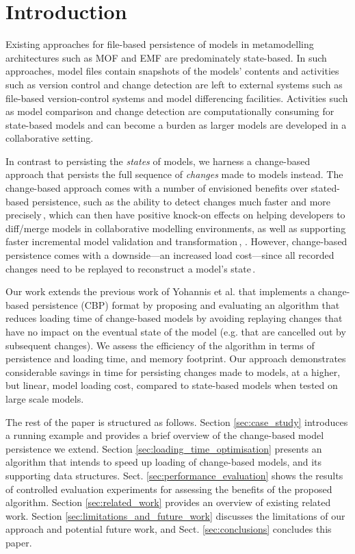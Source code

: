 \documentclass{llncs}
\begin{document}
\section{Introduction}
\label{sec:introduction}
Existing approaches for file-based persistence of models in metamodelling architectures such as MOF and EMF are predominately state-based. In such approaches, model files contain snapshots of the models' contents and activities such as version control and change detection are left to external systems such as file-based version-control systems and model differencing facilities. Activities such as model comparison and change detection are computationally consuming for state-based models and can become a burden as larger models are developed in a collaborative setting. 

In contrast to persisting the \emph{states} of models, we harness a change-based approach that persists the full sequence of \emph{changes} made to models instead. The change-based approach comes with a number of envisioned benefits over stated-based persistence, such as the ability to detect changes much faster and more precisely\,\cite{yohannis2017turning}, which can then have positive knock-on effects on helping developers to diff/merge models in collaborative modelling environments, as well as supporting faster incremental model validation and transformation\,\cite{rath2012derived}, \cite{ogunyomi2015property}. However, change-based persistence comes with a downside---an increased load cost---since all recorded changes need to be replayed to reconstruct a model's state\,\cite{yohannis2017turning}.   

Our work extends the previous work of Yohannis et al. \cite{yohannis2017turning} that implements a change-based persistence (CBP) format by proposing and evaluating an algorithm that reduces loading time of change-based models by avoiding replaying changes that have no impact on the eventual state of the model (e.g. that are cancelled out by subsequent changes). We assess the efficiency of the algorithm in terms of persistence and loading time, and memory footprint. Our approach demonstrates considerable savings in time for persisting changes made to models, at a higher, but linear, model loading cost, compared to state-based models when tested on large scale models. %

The rest of the paper is structured as follows. Section \ref{sec:case_study} introduces a running example and provides a brief overview of the change-based model persistence we extend. Section \ref{sec:loading_time_optimisation} presents an algorithm that intends to speed up loading of change-based models, and its supporting data structures. %
Sect. \ref{sec:performance_evaluation} shows the results of controlled evaluation experiments for assessing the benefits of the proposed algorithm. Section \ref{sec:related_work} provides an overview of existing related work. Section \ref{sec:limitations_and_future_work} discusses the limitations of our approach and potential future work, and Sect. \ref{sec:conclusions} concludes this paper.
\end{document}
